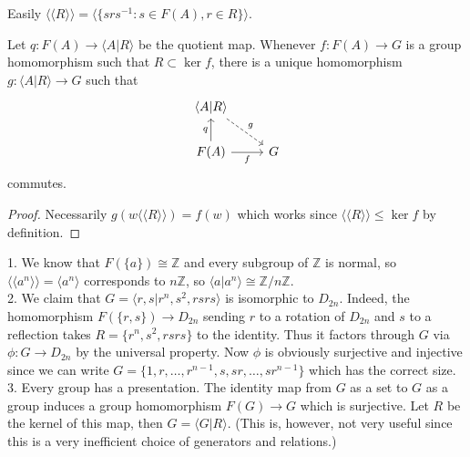 Easily $\langle\langle R\rangle\rangle=\langle\{srs^{-1}:s\in F(A),r\in R\}\rangle$.
\begin{lemma}
    Let $q:F(A)\to\langle A|R\rangle$ be the quotient map.
    Whenever $f:F(A)\to G$ is a group homomorphism such that $R\subset\ker f$, there is a unique homomorphism $g:\langle A|R\rangle\to G$ such that
    \[
        \begin{tikzcd}
            \langle A|R\rangle\arrow[dashed]{dr}{g}&\\
            F(A)\arrow{u}{q}\arrow[swap]{r}{f}&G
        \end{tikzcd}
    \]
    commutes.
\end{lemma}
\begin{proof}
    Necessarily $g(w\langle\langle R\rangle\rangle)=f(w)$ which works since $\langle\langle R\rangle\rangle\le\ker f$ by definition.
\end{proof}
\begin{example}
    1. We know that $F(\{a\})\cong\mathbb Z$ and every subgroup of $\mathbb Z$ is normal, so $\langle\langle a^n\rangle\rangle=\langle a^n\rangle$ corresponds to $n\mathbb Z$, so $\langle a|a^n\rangle\cong\mathbb Z/n\mathbb Z$.\\
    2. We claim that $G=\langle r,s|r^n,s^2,rsrs\rangle$ is isomorphic to $D_{2n}$.
    Indeed, the homomorphism $F(\{r,s\})\to D_{2n}$ sending $r$ to a rotation of $D_{2n}$ and $s$ to a reflection takes $R=\{r^n,s^2,rsrs\}$ to the identity.
    Thus it factors through $G$ via $\phi:G\to D_{2n}$ by the universal property.
    Now $\phi$ is obviously surjective and injective since we can write $G=\{1,r,\ldots,r^{n-1},s,sr,\ldots,sr^{n-1}\}$ which has the correct size.\\
    3. Every group has a presentation.
    The identity map from $G$ as a set to $G$ as a group induces a group homomorphism $F(G)\to G$ which is surjective.
    Let $R$ be the kernel of this map, then $G=\langle G|R\rangle$.
    (This is, however, not very useful since this is a very inefficient choice of generators and relations.)
\end{example}
